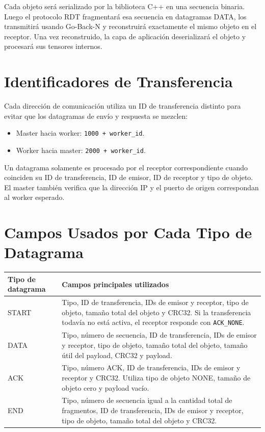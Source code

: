 \documentclass[12pt]{article}
\begin{document}
Cada objeto será serializado por la biblioteca C++ en una secuencia binaria.
Luego el protocolo RDT fragmentará esa secuencia en datagramas DATA, los
transmitirá usando Go-Back-N y reconstruirá exactamente el mismo objeto en el
receptor. Una vez reconstruido, la capa de aplicación deserializará el objeto
y procesará sus tensores internos.

\section{Identificadores de Transferencia}

Cada dirección de comunicación utiliza un ID de transferencia distinto para
evitar que los datagramas de envío y respuesta se mezclen:

\begin{itemize}
\item Master hacia worker: \texttt{1000 + worker\_id}.
\item Worker hacia master: \texttt{2000 + worker\_id}.
\end{itemize}

Un datagrama solamente es procesado por el receptor correspondiente cuando
coinciden su ID de transferencia, ID de emisor, ID de receptor y tipo de
objeto. El master también verifica que la dirección IP y el puerto de origen
correspondan al worker esperado.

\section{Campos Usados por Cada Tipo de Datagrama}

\begin{longtable}{|l|p{10cm}|}
\hline
Tipo de datagrama & Campos principales utilizados \\
\hline
START & Tipo, ID de transferencia, IDs de emisor y receptor, tipo de objeto, tamaño total del objeto y CRC32. Si la transferencia todavía no está activa, el receptor responde con \texttt{ACK\_NONE}. \\
\hline
DATA & Tipo, número de secuencia, ID de transferencia, IDs de emisor y receptor, tipo de objeto, tamaño total del objeto, tamaño útil del payload, CRC32 y payload. \\
\hline
ACK & Tipo, número ACK, ID de transferencia, IDs de emisor y receptor y CRC32. Utiliza tipo de objeto NONE, tamaño de objeto cero y payload vacío. \\
\hline
END & Tipo, número de secuencia igual a la cantidad total de fragmentos, ID de transferencia, IDs de emisor y receptor, tipo de objeto, tamaño total del objeto y CRC32. \\
\hline
\end{longtable}
\end{document}
